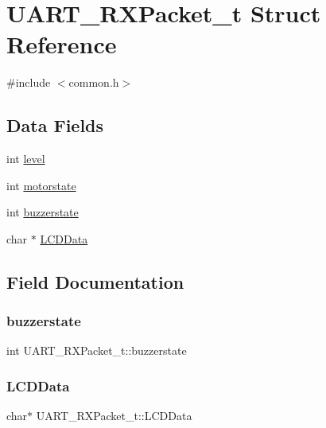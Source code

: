 \hypertarget{struct_u_a_r_t___r_x_packet__t}{}\section{U\+A\+R\+T\+\_\+\+R\+X\+Packet\+\_\+t Struct Reference}
\label{struct_u_a_r_t___r_x_packet__t}


{\ttfamily \#include $<$common.\+h$>$}

\subsection*{Data Fields}
\begin{DoxyCompactItemize}
\item 
int \mbox{\hyperlink{struct_u_a_r_t___r_x_packet__t_affe75dc489fae21968abbd37cfb8ae12}{level}}
\item 
int \mbox{\hyperlink{struct_u_a_r_t___r_x_packet__t_a598dbd9b07a1a0f4bd1b1d943be3966d}{motorstate}}
\item 
int \mbox{\hyperlink{struct_u_a_r_t___r_x_packet__t_ac130b25811f473f3cf3b67a47d4c6e0d}{buzzerstate}}
\item 
char $\ast$ \mbox{\hyperlink{struct_u_a_r_t___r_x_packet__t_a274838bdc010eaa6320c5bc3909db191}{L\+C\+D\+Data}}
\end{DoxyCompactItemize}


\subsection{Field Documentation}
\mbox{\label{struct_u_a_r_t___r_x_packet__t_ac130b25811f473f3cf3b67a47d4c6e0d}} 
\subsubsection{\texorpdfstring{buzzerstate}{buzzerstate}}
{\footnotesize\ttfamily int U\+A\+R\+T\+\_\+\+R\+X\+Packet\+\_\+t\+::buzzerstate}

\mbox{\label{struct_u_a_r_t___r_x_packet__t_a274838bdc010eaa6320c5bc3909db191}} 
\subsubsection{\texorpdfstring{LCDData}{LCDData}}
{\footnotesize\ttfamily char$\ast$ U\+A\+R\+T\+\_\+\+R\+X\+Packet\+\_\+t\+::\+L\+C\+D\+Data}

